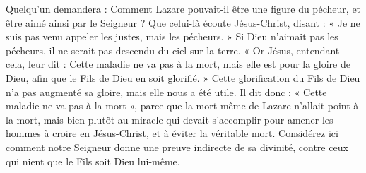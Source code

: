 Quelqu’un demandera : Comment Lazare pouvait-il être une figure du pécheur, et être aimé ainsi par le Seigneur ? Que celui-là écoute Jésus-Christ, disant : « Je ne suis pas venu appeler les justes, mais les pécheurs. » Si Dieu n’aimait pas les pécheurs, il ne serait pas descendu du ciel sur la terre. « Or Jésus, entendant cela, leur dit : Cette maladie ne va pas à la mort, mais elle est pour la gloire de Dieu, afin que le Fils de Dieu en soit glorifié. » Cette glorification du Fils de Dieu n’a pas augmenté sa gloire, mais elle nous a été utile. Il dit donc : « Cette maladie ne va pas à la mort », parce que la mort même de Lazare n’allait point à la mort, mais bien plutôt au miracle qui devait s’accomplir pour amener les hommes à croire en Jésus-Christ, et à éviter la véritable mort. Considérez ici comment notre Seigneur donne une preuve indirecte de sa divinité, contre ceux qui nient que le Fils soit Dieu lui-même.
